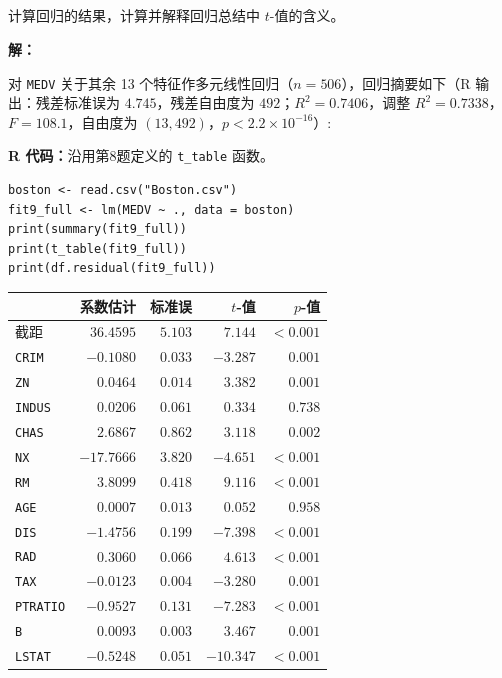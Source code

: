 \documentclass[12pt,a4paper]{article}
\begin{document}
\subsection{}

计算回归的结果，计算并解释回归总结中 $t$-值的含义。

\begin{answerbox}
\textbf{解：}

对 \texttt{MEDV} 关于其余 13 个特征作多元线性回归（$n=506$），回归摘要如下（R 输出：残差标准误为 $4.745$，残差自由度为 $492$；$R^2=0.7406$，调整 $R^2=0.7338$，$F=108.1$，自由度为 $(13,492)$，$p<2.2\times10^{-16}$）:

\textbf{R 代码：}沿用第8题定义的 \texttt{t\_table} 函数。
\begin{lstlisting}[style=rcode]
boston <- read.csv("Boston.csv")
fit9_full <- lm(MEDV ~ ., data = boston)
print(summary(fit9_full))
print(t_table(fit9_full))
print(df.residual(fit9_full))
\end{lstlisting}


\begin{center}
\small
\begin{tabular}{lrrrr}
\toprule
 & 系数估计 & 标准误 & $t$-值 & $p$-值 \\
\midrule
截距      & $36.4595$ & $5.103$ & $7.144$  & $<0.001$ \\
\texttt{CRIM}    & $-0.1080$ & $0.033$ & $-3.287$ & $0.001$ \\
\texttt{ZN}      & $0.0464$  & $0.014$ & $3.382$  & $0.001$ \\
\texttt{INDUS}   & $0.0206$  & $0.061$ & $0.334$  & $0.738$ \\
\texttt{CHAS}    & $2.6867$  & $0.862$ & $3.118$  & $0.002$ \\
\texttt{NX}      & $-17.7666$& $3.820$ & $-4.651$ & $<0.001$ \\
\texttt{RM}      & $3.8099$  & $0.418$ & $9.116$  & $<0.001$ \\
\texttt{AGE}     & $0.0007$  & $0.013$ & $0.052$  & $0.958$ \\
\texttt{DIS}     & $-1.4756$ & $0.199$ & $-7.398$ & $<0.001$ \\
\texttt{RAD}     & $0.3060$  & $0.066$ & $4.613$  & $<0.001$ \\
\texttt{TAX}     & $-0.0123$ & $0.004$ & $-3.280$ & $0.001$ \\
\texttt{PTRATIO} & $-0.9527$ & $0.131$ & $-7.283$ & $<0.001$ \\
\texttt{B}       & $0.0093$  & $0.003$ & $3.467$  & $0.001$ \\
\texttt{LSTAT}   & $-0.5248$ & $0.051$ & $-10.347$& $<0.001$ \\
\bottomrule
\end{tabular}
\end{center}


\end{answerbox}
\end{document}
